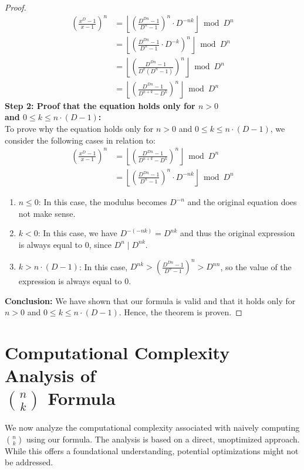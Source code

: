 \documentclass{article}
\theoremstyle{plain}
\theoremstyle{definition}
\begin{document}
\begin{proof}
\begin{align}
    [x^k] \left(\frac{x^{D}-1}{x-1}\right)^n &= \left\lfloor \left(\frac{D^{Dn} - 1}{D^{n} - 1}\right)^n \cdot D^{-n k}\right\rfloor \bmod D^n \\
    &= \left\lfloor \left(\frac{D^{Dn} - 1}{D^{n} - 1} \cdot D^{-k}\right)^n\right\rfloor \bmod D^n \\
    &= \left\lfloor \left(\frac{D^{Dn} - 1}{D^k (D^{n} - 1)}\right)^n\right\rfloor \bmod D^n \\
    &= \left\lfloor \left(\frac{D^{Dn} - 1}{D^{n+k} - D^k}\right)^n\right\rfloor \bmod D^n
\end{align}
\textbf{Step 2: Proof that the equation holds only for $n > 0$\\and $0 \leq k \leq n \cdot (D - 1)$:} \\
To prove why the equation holds only for $n > 0$ and $0 \leq k \leq n \cdot (D-1)$, we consider the following cases in relation to:
\begin{align}
    [x^k] \left(\frac{x^{D}-1}{x-1}\right)^n &= \left\lfloor \left(\frac{D^{Dn} - 1}{D^{n+k} - D^k}\right)^n\right\rfloor \bmod D^n \\
    &= \left\lfloor \left(\frac{D^{Dn} - 1}{D^{n} - 1}\right)^n \cdot D^{-n k}\right\rfloor \bmod D^n
\end{align}
\begin{enumerate}
    \item $n \leq 0$: In this case, the modulus becomes $D^{-n}$ and the original equation does not make sense.
    \item $k < 0$: In this case, we have $D^{-(-nk)} = D^{nk}$ and thus the original expression is always equal to $0$, since $D^{n} \mid D^{nk}$.
    \item $k > n \cdot (D-1)$: In this case, $D^{nk} > \left(\frac{D^{Dn} - 1}{D^{n} - 1}\right)^{n} > D^{nn}$, so the value of the expression is always equal to $0$.
\end{enumerate}
\noindent
\textbf{Conclusion:}
We have shown that our formula is valid and that it holds only for $n > 0$ and $0 \leq k \leq n \cdot (D - 1)$. Hence, the theorem is proven.
\end{proof}

\section[Computational Complexity Analysis of Binomial Coefficient Formula]{Computational Complexity Analysis of\\ \(\binom{n}{k}\) Formula}
We now analyze the computational complexity associated with naively computing $\binom{n}{k}$ using our formula. The analysis is based on a direct, unoptimized approach. While this offers a foundational understanding, potential optimizations might not be addressed.
\end{document}
